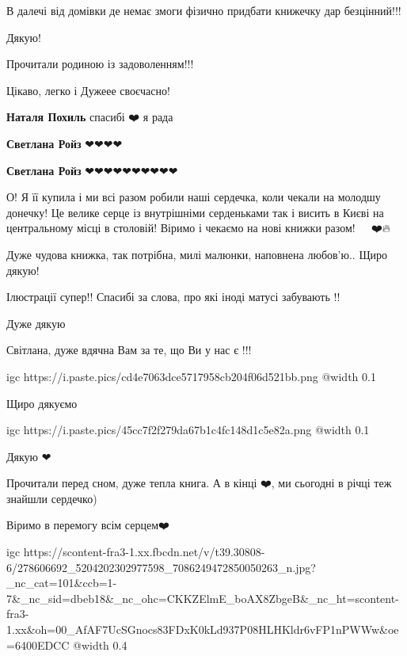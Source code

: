 
В далечі від домівки де немає змоги фізично придбати книжечку дар безцінний!!!

Дякую!

\begin{itemize} %

Прочитали родиною із задоволенням!!!

Цікаво, легко і Дужеее своєчасно!

\textbf{Наталя Похиль} спасибі ❤️ я рада

\textbf{Светлана Ройз} ❤❤❤❤

\textbf{Светлана Ройз} ❤❤❤❤❤❤❤❤❤❤
\end{itemize} %


О! Я її купила і ми всі разом робили наші сердечка, коли чекали на молодшу
донечку! Це велике серце із внутрішніми серденьками так і висить в Києві на
центральному місці в столовій! Віримо і чекаємо на нові книжки разом!
🧡🙏🇺🇦❤️🔥


Дуже чудова книжка, так потрібна, милі малюнки, наповнена любов'ю.. Щиро дякую!
🥰🌷🌷🌷


Ілюстрації супер!! Спасибі за слова, про які іноді матусі забувають !!


Дуже дякую🙏💛💙


Світлана, дуже вдячна Вам за те, що Ви у нас є !!!

\ifcmt
  igc https://i.paste.pics/cd4e7063dce5717958cb204f06d521bb.png
	@width 0.1
\fi


Щиро дякуємо 🙏😍🌷

\ifcmt
  igc https://i.paste.pics/45cc7f2f279da67b1c4fc148d1c5e82a.png
	@width 0.1
\fi


Дякую ❤


Прочитали перед сном, дуже тепла книга. А в кінці ❤️, ми сьогодні в річці теж
знайшли сердечко)

Віримо в перемогу всім серцем❤️

\ifcmt
  igc https://scontent-fra3-1.xx.fbcdn.net/v/t39.30808-6/278606692_5204202302977598_7086249472850050263_n.jpg?_nc_cat=101&ccb=1-7&_nc_sid=dbeb18&_nc_ohc=CKKZElmE_boAX8ZbgeB&_nc_ht=scontent-fra3-1.xx&oh=00_AfAF7UcSGnocs83FDxK0kLd937P08HLHKldr6vFP1nPWWw&oe=6400EDCC
	@width 0.4
\fi

